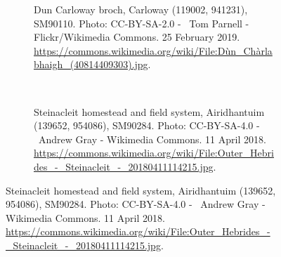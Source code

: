 \begin{figure}
  \centering
  \begin{subfigure}[t]{.48\textwidth}
    \caption*{Dun Carloway broch, Carloway (119002, 941231), SM90110. Photo: CC-BY-SA-2.0 - \textcopyright~Tom Parnell - Flickr/Wikimedia Commons. 25 February 2019. \url{https://commons.wikimedia.org/wiki/File:Dùn_Chàrlabhaigh_(40814409303).jpg}.}
  \end{subfigure}
  ~
  \begin{subfigure}[t]{.48\textwidth}
    \caption*{Steinacleit homestead and field system, Airidhantuim (139652, 954086), SM90284. Photo: CC-BY-SA-4.0 - \textcopyright~Andrew Gray - Wikimedia Commons. 11 April 2018. \url{https://commons.wikimedia.org/wiki/File:Outer_Hebrides_-_Steinacleit_-_20180411114215.jpg}.}

\end{subfigure}
\end{figure}
